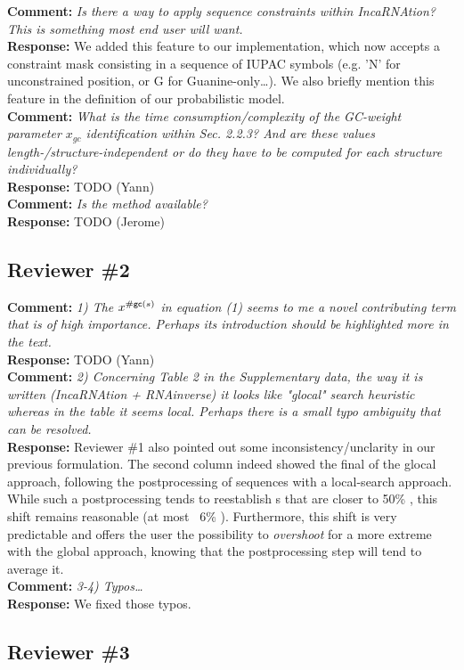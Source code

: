 \documentclass[11pt,hyperref,draft]{article} %
\newcommand{\Answer}[1]{\noindent\textsf{\textbf{Response: }}{\sf#1}\\}
\newcommand{\Comment}[1]{\noindent\textsf{\textbf{Comment: }}{\it#1}\\[.5em]}
\begin{document}
\Comment{Is there a way to apply sequence constraints within IncaRNAtion? This is something most end user will want.
}
\Answer{We added this feature to our implementation, which now accepts a constraint mask consisting in a sequence of IUPAC symbols (e.g. 'N' for unconstrained position, or G for Guanine-only\ldots). We also briefly mention this feature in the definition of our probabilistic model.}

\Comment{What is the time consumption/complexity of the GC-weight parameter $x_{gc}$ identification within Sec. 2.2.3? And are these values length-/structure-independent or do they have to be computed for each structure individually?}
\Answer{TODO (Yann)}

\Comment{Is the method available?}
\Answer{TODO (Jerome)}

\subsection{Reviewer \#2}

\Comment{1) The $x^{{\#\text{{\sf gc}}}(s)}$ in equation (1) seems to me a novel contributing term that is of high importance. Perhaps its introduction should be highlighted more in the text.}
\Answer{TODO (Yann)}

\Comment{2) Concerning Table 2 in the Supplementary data, the way it is written (IncaRNAtion + RNAinverse) it looks like "glocal" search heuristic whereas in the table it seems local. Perhaps there is a small typo ambiguity that can be resolved.}
\Answer{Reviewer \#1 also pointed out some inconsistency/unclarity in our previous formulation. The second column indeed showed the final \GCContent of the glocal approach, following the postprocessing of sequences with a local-search approach. While such a postprocessing tends to reestablish \GCContent{}s that are  closer to 50\% \GC, this shift remains reasonable (at most ~6\% \GC). Furthermore, this shift is very predictable and offers the user the possibility to \emph{overshoot} for a more extreme \GCContent with the global approach, knowing that the postprocessing step will tend to average it.}

\Comment{3-4) Typos\ldots}
\Answer{We fixed those typos.}

\subsection{Reviewer \#3}
\end{document}
